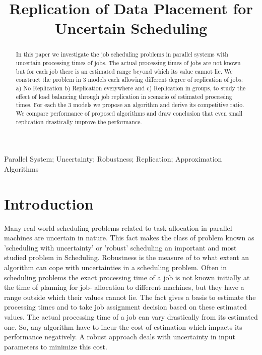 \documentclass[10pt, conference, compsocconf]{IEEEtran}
\begin{document}
\title{Replication of Data Placement for Uncertain Scheduling}


\author{
}

\maketitle


\begin{abstract}
In this paper we investigate the job scheduling problems in parallel systems with uncertain processing times of jobs. The actual processing times of jobs are not known but for each job there is an estimated range beyond which its value cannot lie. We construct the problem in 3 models each allowing different degree of replication of jobs: a) No Replication b) Replication everywhere and  c) Replication in groups, to study the effect of load balancing through job replication in scenario of estimated processing times.  For each the 3 models we propose an algorithm and derive its competitive ratio. We compare performance of  proposed algorithms and draw conclusion that even small replication drastically improve the performance. 

\end{abstract}

\begin{IEEEkeywords}
Parallel System; Uncertainty; Robustness; Replication; Approximation Algorithms

\end{IEEEkeywords}


\IEEEpeerreviewmaketitle

\section{Introduction}

Many real world scheduling problems related to task allocation in parallel machines are uncertain in nature. This fact makes the class of problem known as 'scheduling with uncertainty' or 'robust' scheduling an important and most studied problem in Scheduling. Robustness is the measure of to what extent an algorithm can cope with uncertainties in a scheduling problem. Often in scheduling problems the exact processing time of a job is not known initially at the time of planning for job- allocation to different machines, but they have a range outside which their values cannot lie. The fact gives a basis to estimate the processing times and to take job assignment decision based on these estimated values. The actual processing time of a job can vary drastically from its estimated one. So, any algorithm have to incur the cost of estimation which impacts its performance negatively. A robust approach deals with uncertainty in input parameters to minimize this cost.
\end{document}
